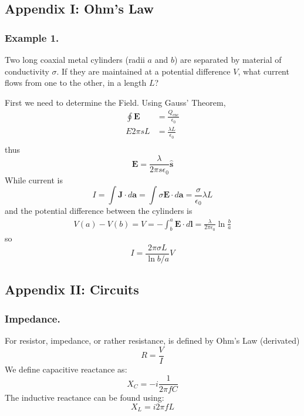 \documentclass[../../../main.tex]{subfiles}
\begin{document}
\subsection*{Appendix I: Ohm's Law}
\subsubsection*{Example 1.} Two long coaxial metal cylinders (radii $a$ and $b$) are separated by material of conductivity $\sigma$. If they are maintained at a potential difference $V$, what current ﬂows from one to the other, in a length $L$?

First we need to determine the Field. Using Gauss' Theorem,
\begin{align*}
    \oint \mathbf{E}&=\frac{Q_\text{enc}}{\epsilon_0}\\
    E2\pi sL&=\frac{\lambda L}{\epsilon_0}\\
\end{align*}
thus
\begin{equation*}
    \mathbf{E}=\frac{\lambda}{2\pi s\epsilon_0}\mathbf{\hat{s}}
\end{equation*}
While current is
\begin{equation*}
    I=\int \mathbf{J}\cdot d\mathbf{a}=\int \sigma\mathbf{E}\cdot d\mathbf{a}=\frac{\sigma}{\epsilon_0}\lambda L
\end{equation*}
and the potential difference between the cylinders is
\begin{align*}
    V(a)-V(b)=V=-\int_{b}^{a}\mathbf{E}\cdot d\mathbf{l}=\frac{\lambda}{2\pi\epsilon_0}\ln \frac{b}{a}
\end{align*}
so
\begin{equation*}
    I=\frac{2\pi\sigma L}{\ln b/a}V
\end{equation*}
\begin{figure*}[h]
    \centering
\end{figure*}

\subsection*{Appendix II: Circuits}
\subsubsection*{Impedance.} For resistor, impedance, or rather resistance, is defined by Ohm's Law (derivated) 
\begin{equation*}
    R=\frac{V}{I}
\end{equation*}
We define capacitive reactance as:
\begin{equation*}
    X_C=-i\frac{1}{2\pi fC}
\end{equation*}
The inductive reactance can be found using:
\begin{equation*}
    X_L=i2\pi f L
\end{equation*}
\end{document}
